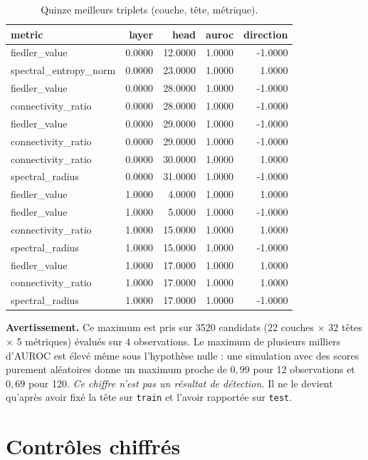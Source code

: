 \documentclass[11pt,a4paper]{article}
\begin{document}
\begin{table}[htbp]
\centering
\small
\begin{tabular}{lrrrr}
\hline
metric & layer & head & auroc & direction \\
\hline
fiedler\_value & 0.0000 & 12.0000 & 1.0000 & -1.0000 \\
spectral\_entropy\_norm & 0.0000 & 23.0000 & 1.0000 & 1.0000 \\
fiedler\_value & 0.0000 & 28.0000 & 1.0000 & -1.0000 \\
connectivity\_ratio & 0.0000 & 28.0000 & 1.0000 & -1.0000 \\
fiedler\_value & 0.0000 & 29.0000 & 1.0000 & -1.0000 \\
connectivity\_ratio & 0.0000 & 29.0000 & 1.0000 & -1.0000 \\
connectivity\_ratio & 0.0000 & 30.0000 & 1.0000 & 1.0000 \\
spectral\_radius & 0.0000 & 31.0000 & 1.0000 & -1.0000 \\
fiedler\_value & 1.0000 & 4.0000 & 1.0000 & 1.0000 \\
fiedler\_value & 1.0000 & 5.0000 & 1.0000 & -1.0000 \\
connectivity\_ratio & 1.0000 & 15.0000 & 1.0000 & 1.0000 \\
spectral\_radius & 1.0000 & 15.0000 & 1.0000 & -1.0000 \\
fiedler\_value & 1.0000 & 17.0000 & 1.0000 & 1.0000 \\
connectivity\_ratio & 1.0000 & 17.0000 & 1.0000 & 1.0000 \\
spectral\_radius & 1.0000 & 17.0000 & 1.0000 & -1.0000 \\
\hline
\end{tabular}
\caption{Quinze meilleurs triplets (couche, tête, métrique).}
\label{tab:heads}
\end{table}


\textbf{Avertissement.} Ce maximum est pris sur 3520 candidats
(22 couches $\times$ 32 têtes
$\times$ 5 métriques) évalués sur 4
observations. Le maximum de plusieurs milliers d'AUROC est élevé même sous
l'hypothèse nulle : une simulation avec des scores purement aléatoires donne
un maximum proche de $0{,}99$ pour 12 observations et $0{,}69$ pour 120.
\emph{Ce chiffre n'est pas un résultat de détection.} Il ne le devient
qu'après avoir fixé la tête sur \texttt{train} et l'avoir rapportée sur
\texttt{test}.


\section{Contrôles chiffrés}
\end{document}
